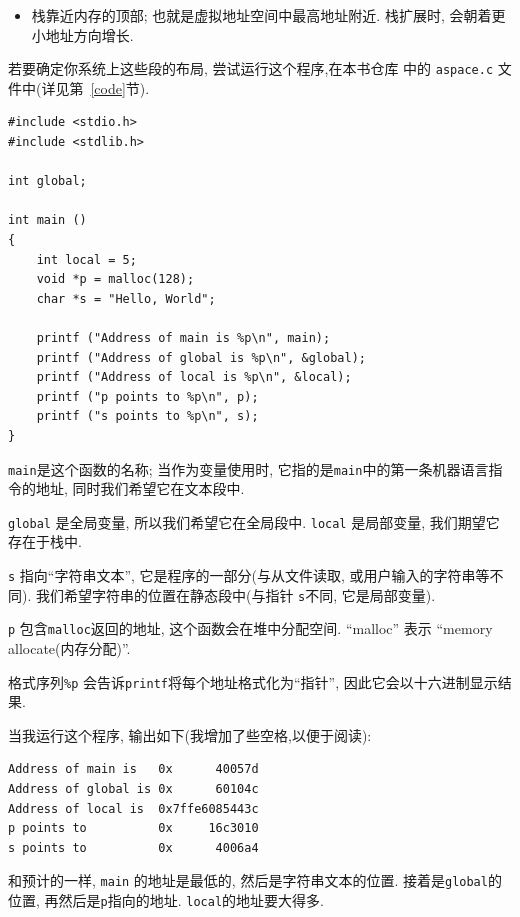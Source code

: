 \documentclass[12pt]{book}
\begin{document}
{\begin{itemize}
\item 栈靠近内存的顶部; 也就是虚拟地址空间中最高地址附近.
栈扩展时, 会朝着更小地址方向增长.

\end{itemize}


若要确定你系统上这些段的布局, 尝试运行这个程序,在本书仓库
中的 {\tt aspace.c} 文件中(详见第~\ref{code}节). 


\begin{verbatim}
#include <stdio.h>
#include <stdlib.h>

int global;

int main ()
{
    int local = 5;
    void *p = malloc(128);
    char *s = "Hello, World";

    printf ("Address of main is %p\n", main);
    printf ("Address of global is %p\n", &global);
    printf ("Address of local is %p\n", &local);
    printf ("p points to %p\n", p);
    printf ("s points to %p\n", s);
}
\end{verbatim}

{\tt main}是这个函数的名称; 当作为变量使用时, 
它指的是{\tt main}中的第一条机器语言指令的地址, 
同时我们希望它在文本段中.

{\tt global} 是全局变量, 所以我们希望它在全局段中. 
{\tt local} 是局部变量, 我们期望它存在于栈中.

{\tt s} 指向``字符串文本'', 它是程序的一部分(与从文件读取, 
或用户输入的字符串等不同). 我们希望字符串的位置在静态段中(与指针
{\tt s}不同, 它是局部变量).

{\tt p} 包含{\tt malloc}返回的地址, 
这个函数会在堆中分配空间. ``malloc'' 表示 ``memory allocate(内存分配)''.

格式序列\verb"%p" 会告诉{\tt printf}将每个地址格式化为``指针'',
因此它会以十六进制显示结果.

当我运行这个程序, 输出如下(我增加了些空格,以便于阅读):


\begin{verbatim}
Address of main is   0x      40057d
Address of global is 0x      60104c
Address of local is  0x7ffe6085443c
p points to          0x     16c3010
s points to          0x      4006a4

\end{verbatim}

和预计的一样, {\tt main} 的地址是最低的, 然后是字符串文本的位置.
接着是{\tt global}的位置, 再然后是{\tt p}指向的地址.
{\tt local}的地址要大得多.

}
\end{document}
